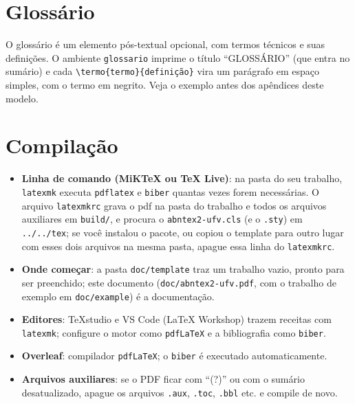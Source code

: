 \section{Glossário}

O glossário é um elemento pós-textual opcional, com termos técnicos e suas definições. O
ambiente \texttt{glossario} imprime o título ``GLOSSÁRIO'' (que entra no sumário) e cada
\texttt{\textbackslash termo\{termo\}\{definição\}} vira um parágrafo em espaço simples,
com o termo em negrito. Veja o exemplo antes dos apêndices deste modelo.

\section{Compilação}

\begin{itemize}
  \item \textbf{Linha de comando (MiKTeX ou TeX Live)}: na pasta do seu trabalho,
        \texttt{latexmk} executa \texttt{pdflatex} e \texttt{biber} quantas vezes forem
        necessárias. O arquivo \texttt{latexmkrc} grava o \ac{pdf} na pasta do trabalho e
        todos os arquivos auxiliares em \texttt{build/}, e procura o
        \texttt{abntex2-ufv.cls} (e o \texttt{.sty}) em \texttt{../../tex}; se você instalou o
        pacote, ou copiou o template para outro lugar com esses dois arquivos na mesma pasta, apague essa
        linha do \texttt{latexmkrc}.
  \item \textbf{Onde começar}: a pasta \texttt{doc/template} traz um trabalho vazio, pronto
        para ser preenchido; este documento (\texttt{doc/abntex2-ufv.pdf}, com o trabalho de
        exemplo em \texttt{doc/example}) é a documentação.
  \item \textbf{Editores}: TeXstudio e VS Code (LaTeX Workshop) trazem receitas com
        \texttt{latexmk}; configure o motor como \texttt{pdfLaTeX} e a bibliografia como \texttt{biber}.
  \item \textbf{Overleaf}: compilador \texttt{pdfLaTeX}; o \texttt{biber} é executado
        automaticamente.
  \item \textbf{Arquivos auxiliares}: se o PDF ficar com ``(?)'' ou com o sumário
        desatualizado, apague os arquivos \texttt{.aux}, \texttt{.toc}, \texttt{.bbl}
        etc. e compile de novo.
\end{itemize}
